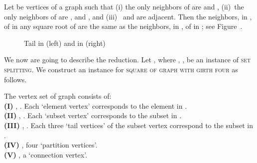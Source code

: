 \documentclass[proceedings]{stacs}
\newlength{\ai}
\begin{document}
\begin{center}
\begin{lemma}\label{lem:tail}
Let  be vertices of a graph  such that (i) the only neighbors of  are  and ,
(ii)~the only neighbors of  are , and , and
(iii)~ and  are adjacent.
Then the neighbors, in , of  in any square root of  are the same as the
neighbors, in , of  in ; see Figure~.
\end{lemma}
\begin{figure}[H]
  \begin{center}
    \caption{Tail in  (left) and in  (right)}
    \label{tail}
  \end{center}
\end{figure}

We now are going to describe the reduction.
Let ,  where , ,
be an instance of \textsc{set splitting}. We construct an instance  for
\textsc{square of graph with girth four} as follows.

The vertex set of graph  consists of:\\
\textbf{(I)} , . Each `element vertex'  corresponds to the element  in .\\
\textbf{(II)} , . Each `subset vertex'  corresponds to the subset  in .\\
\textbf{(III)} , . Each three `tail vertices'  of
       the subset vertex  correspond to the subset  in .\\
\textbf{(IV)} , four `partition vertices'.\\
\textbf{(V)} , a `connection vertex'.


\end{center}
\end{document}
